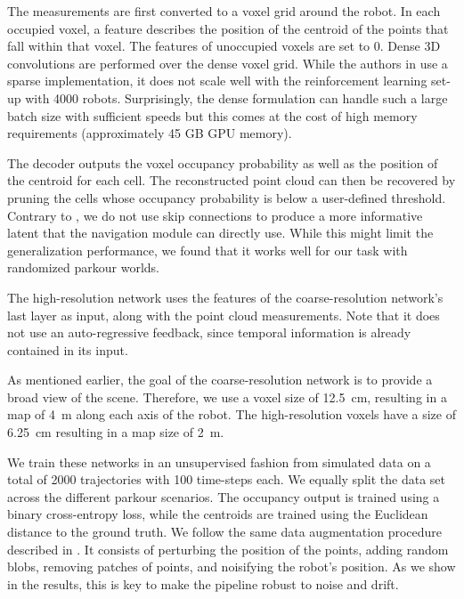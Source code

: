 \documentclass[conference]{IEEEtran}
\begin{document}
The measurements are first converted to a voxel grid around the robot. In each occupied voxel, a feature describes the position of the centroid of the points that fall within that voxel. The features of unoccupied voxels are set to 0. Dense 3D convolutions are performed over the dense voxel grid. While the authors in \cite{hoeller2022TREP} use a sparse implementation, it does not scale well with the reinforcement learning set-up with 4000 robots. Surprisingly, the dense formulation can handle such a large batch size with sufficient speeds but this comes at the cost of high memory requirements (approximately 45 GB GPU memory).

The decoder outputs the voxel occupancy probability as well as the position of the centroid for each cell. The reconstructed point cloud can then be recovered by pruning the cells whose occupancy probability is below a user-defined threshold.
Contrary to \cite{hoeller2022TREP}, we do not use skip connections to produce a more informative latent that the navigation module can directly use. While this might limit the generalization performance, we found that it works well for our task with randomized parkour worlds.

The high-resolution network uses the features of the coarse-resolution network's last layer as input, along with the point cloud measurements. Note that it does not use an auto-regressive feedback, since temporal information is already contained in its input.

As mentioned earlier, the goal of the coarse-resolution network is to provide a broad view of the scene. Therefore, we use a voxel size of \SI{12.5}{\cm}, resulting in a map of \SI{4}{\m} along each axis of the robot. The high-resolution voxels have a size of \SI{6.25}{\cm} resulting in a map size of \SI{2}{\m}.

We train these networks in an unsupervised fashion from simulated data on a total of 2000 trajectories with 100 time-steps each. We equally split the data set across the different parkour scenarios.
The occupancy output is trained using a binary cross-entropy loss, while the centroids are trained using the Euclidean distance to the ground truth. We follow the same data augmentation procedure described in \cite{hoeller2022TREP}. It consists of perturbing the position of the points, adding random blobs, removing patches of points, and noisifying the robot's position. As we show in the results, this is key to make the pipeline robust to noise and drift.
\end{document}
